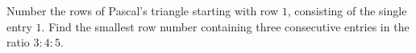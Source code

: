Number the rows of Pascal's triangle starting with row $1$, consisting of the single entry $1$. Find the smallest row number containing three consecutive entries in the ratio $3:4:5$.

